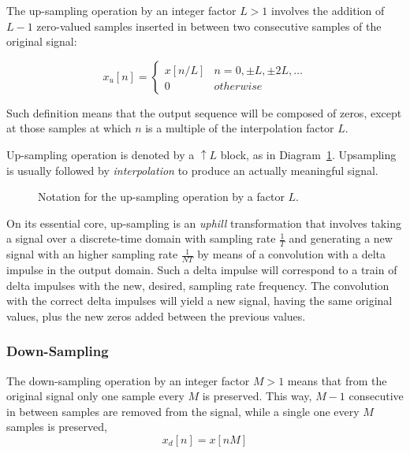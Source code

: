\documentclass[\documentfontsize, twocolumn]{\classname}
\begin{document}
The up-sampling operation by an integer factor $L > 1$ involves the addition of
$L-1$ zero-valued samples inserted in between two consecutive samples of the
original signal:

\begin{equation}\label{eqn:UpSampling}
	x_u[n] =
	\left\{
		\begin{array}{ll}
			x[n/L] 	& n=0,\pm L, \pm 2L, \dots \\
			0 	& otherwise
		\end{array}
	\right.
\end{equation}

Such definition means that the output sequence will be composed of zeros, except at those samples at which $n$ is a multiple of the interpolation factor $L$.

Up-sampling operation is denoted by a $\uparrow L$ block, as in Diagram~\ref{tikz:upsamplingOperation}. Upsampling is usually followed by \emph{interpolation} to produce an actually meaningful signal.

\begin{figure}[ht]
\begin{center}
    \caption{Notation for the up-sampling operation by a factor $L$.}\label{tikz:upsamplingOperation}
\end{center}
\end{figure}

On its essential core, up-sampling is an \emph{uphill} transformation that involves taking a signal over a discrete-time domain with sampling rate $\frac 1 T$ and generating a new signal with an higher sampling rate $\frac 1 {NT}$ by means of a convolution with a delta impulse in the output domain. Such a delta impulse will correspond to a train of delta impulses with the new, desired, sampling rate frequency. The convolution with the correct delta impulses will yield a new signal, having the same original values, plus the new zeros added between the previous values.

\subsubsection{Down-Sampling}

The down-sampling operation by an integer factor $M > 1$ means that from the
original signal only one sample every $M$ is preserved. This way, $M-1$ consecutive
in between samples are removed from the signal, while a single one every $M$ samples is preserved,
\begin{equation}\label{eqn:DownSampling}
	x_d[n] = x[nM]
\end{equation}
\end{document}
